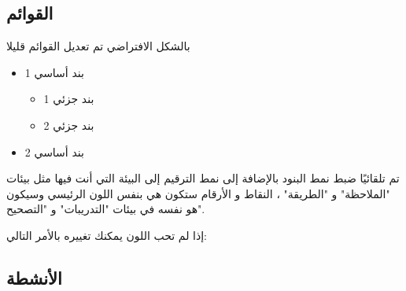 \documentclass[12pt,a4paper]{mathbook_arabic}
\begin{document}
\subsection{القوائم}
 بالشكل الافتراضي تم تعديل القوائم  قليلا  
 

 
 \begin{itemize}
\item بند أساسي 1
\begin{itemize}
\item بند جزئي 1
\item بند جزئي 2
\end{itemize}
\item بند أساسي 2
\end{itemize}



\begin{mabox2}
  تم تلقائيًا ضبط نمط البنود بالإضافة إلى نمط الترقيم إلى البيئة التي 
أنت فيها مثل بيئات "الملاحظة" و "الطريقة" ، النقاط و
  الأرقام ستكون هي  بنفس
 اللون الرئيسي وسيكون هو نفسه في بيئات "التدريبات" و "التصحيح".
\end{mabox2}


إذا لم تحب اللون يمكنك تغييره بالأمر التالي:




\subsection{الأنشطة}
\end{document}

